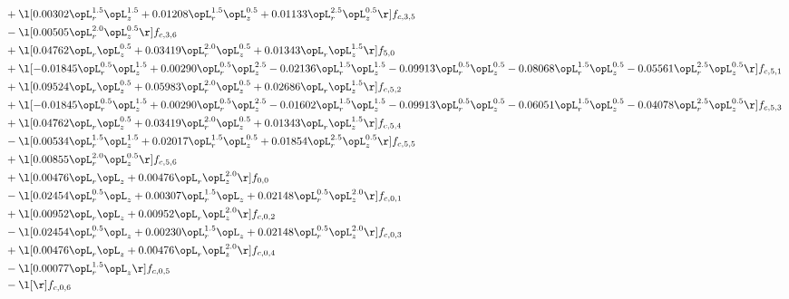 \begin{alignat}{2}
& + \l[  0.00302 \opL_r^{1.5} \opL_z^{1.5} +  0.01208 \opL_r^{1.5} \opL_z^{0.5} +  0.01133 \opL_r^{2.5} \opL_z^{0.5}  \r] f_{c,3,5} \nonumber \\ 
& - \l[  0.00505 \opL_r^{2.0} \opL_z^{0.5}  \r] f_{c,3,6} \nonumber \\ 
& + \l[  0.04762 \opL_r \opL_z^{0.5} +  0.03419 \opL_r^{2.0} \opL_z^{0.5} +  0.01343 \opL_r \opL_z^{1.5}  \r] f_{5,0} \nonumber \\ 
& + \l[  -0.01845 \opL_r^{0.5} \opL_z^{1.5} +  0.00290 \opL_r^{0.5} \opL_z^{2.5}   -0.02136 \opL_r^{1.5} \opL_z^{1.5}   -0.09913 \opL_r^{0.5} \opL_z^{0.5}   -0.08068 \opL_r^{1.5} \opL_z^{0.5}   -0.05561 \opL_r^{2.5} \opL_z^{0.5}  \r] f_{c,5,1} \nonumber \\ 
& + \l[  0.09524 \opL_r \opL_z^{0.5} +  0.05983 \opL_r^{2.0} \opL_z^{0.5} +  0.02686 \opL_r \opL_z^{1.5}  \r] f_{c,5,2} \nonumber \\ 
& + \l[  -0.01845 \opL_r^{0.5} \opL_z^{1.5} +  0.00290 \opL_r^{0.5} \opL_z^{2.5}   -0.01602 \opL_r^{1.5} \opL_z^{1.5}   -0.09913 \opL_r^{0.5} \opL_z^{0.5}   -0.06051 \opL_r^{1.5} \opL_z^{0.5}   -0.04078 \opL_r^{2.5} \opL_z^{0.5}  \r] f_{c,5,3} \nonumber \\ 
& + \l[  0.04762 \opL_r \opL_z^{0.5} +  0.03419 \opL_r^{2.0} \opL_z^{0.5} +  0.01343 \opL_r \opL_z^{1.5}  \r] f_{c,5,4} \nonumber \\ 
& - \l[  0.00534 \opL_r^{1.5} \opL_z^{1.5} +  0.02017 \opL_r^{1.5} \opL_z^{0.5} +  0.01854 \opL_r^{2.5} \opL_z^{0.5}  \r] f_{c,5,5} \nonumber \\ 
& + \l[  0.00855 \opL_r^{2.0} \opL_z^{0.5}  \r] f_{c,5,6} \nonumber \\ 
& + \l[  0.00476 \opL_r \opL_z +  0.00476 \opL_r \opL_z^{2.0}  \r] f_{0,0} \nonumber \\ 
& - \l[  0.02454 \opL_r^{0.5} \opL_z +  0.00307 \opL_r^{1.5} \opL_z +  0.02148 \opL_r^{0.5} \opL_z^{2.0}  \r] f_{c,0,1} \nonumber \\ 
& + \l[  0.00952 \opL_r \opL_z +  0.00952 \opL_r \opL_z^{2.0}  \r] f_{c,0,2} \nonumber \\ 
& - \l[  0.02454 \opL_r^{0.5} \opL_z +  0.00230 \opL_r^{1.5} \opL_z +  0.02148 \opL_r^{0.5} \opL_z^{2.0}  \r] f_{c,0,3} \nonumber \\ 
& + \l[  0.00476 \opL_r \opL_z +  0.00476 \opL_r \opL_z^{2.0}  \r] f_{c,0,4} \nonumber \\ 
& - \l[  0.00077 \opL_r^{1.5} \opL_z  \r] f_{c,0,5} \nonumber \\ 
& - \l[  \r] f_{c,0,6} \nonumber \\ 

\end{alignat}
